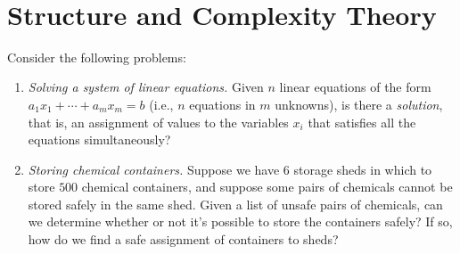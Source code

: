 
~
\vskip5mm

\section{Structure and Complexity Theory}



Consider the following problems:
\begin{enumerate}
\item 
\emph{Solving a system of linear equations.}
Given $n$ linear equations of the form $a_1x_1+\cdots +a_mx_m=b$
(i.e., $n$ equations in $m$ unknowns), is there a \emph{solution},
that is, an assignment of values to the variables $x_i$
that satisfies all the equations simultaneously?

\item
  \emph{Storing chemical containers.}
  Suppose we have 6 storage sheds in which to store $500$
  chemical containers, and suppose some pairs of chemicals cannot be stored
  safely in the same shed.
  Given a list of unsafe pairs of chemicals, can we determine whether or not
  it's possible to store the containers safely?
  If so, how do we find a safe assignment of containers to sheds?
\end{enumerate}


